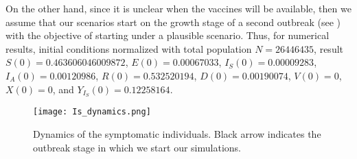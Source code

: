 %
On the other hand, since it is unclear when the vaccines will be available,
then we assume that our scenarios start on the growth stage of a second
outbreak (see ) with the objective of starting
under a plausible scenario. Thus, for numerical results, initial conditions
normalized with total population
$N = \num{26446435}$, result
$S(0) = \num{0.463606046009872}$,
$E(0) = \num{0.00067033}$,
$I_S(0) = \num{0.00009283}$,
$I_A(0) = \num{0.00120986}$,
$R(0) = \num{0.532520194}$,
$D(0) = \num{0.00190074}$,
$V(0) = 0$, $X(0) = 0$, and
$Y_{I_{S}}(0) = \num{0.12258164}$.
\begin{figure*}[tbh]
    \centering
    \texttt{[image: Is\_dynamics.png]}
    \caption{
        Dynamics of the symptomatic individuals. Black arrow indicates
        the outbreak stage in which we start our simulations.}
    \label{Fig:initial_conditions}
\end{figure*}